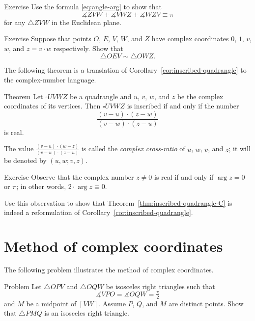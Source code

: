 \begin{thm}{Exercise}\label{ex:3-sum-C}
Use the formula \ref{eq:angle-arg} to show that  
$$\measuredangle ZVW+\measuredangle VWZ+\measuredangle WZV\equiv \pi$$
for any $\triangle ZVW$ in the Euclidean plane.
\end{thm}

\begin{thm}{Exercise}\label{ex:C-sim}
Suppose that points $O$, $E$, $V$, $W$, and $Z$ have complex coordinates $0$, $1$, $v$, $w$, and $z=v\cdot w$ respectively.
Show that 
\[\triangle OEV\sim \triangle OWZ.\]

\end{thm}

The following theorem is a translation of Corollary~\ref{cor:inscribed-quadrangle} to the complex-number language.

\begin{thm}{Theorem}\label{thm:inscribed-quadrangle-C}
Let $\square UVWZ$ be a quadrangle and $u$, $v$, $w$, and $z$ be the complex coordinates of its vertices. 
Then $\square UVWZ$ is inscribed 
if and only if the number
$$\frac{(v-u)\cdot(z-w)}{(v-w)\cdot(z-u)}$$ 
is real.
\end{thm}

The value $\frac{(v-u)\cdot(w-z)}{(v-w)\cdot(z-u)}$ is called the 
\emph{complex cross-ratio} of $u$, $w$, $v$, and $z$; 
it will be denoted by $(u,w;v,z)$.



\begin{thm}{Exercise}\label{ex:real-cross-ratio}
Observe that the complex number $z\ne 0$ is real if and only if $\arg z=0$ or $\pi$;
in other words, $2\cdot\arg z\equiv 0$.

Use this observation to show that Theorem~\ref{thm:inscribed-quadrangle-C}
is indeed a reformulation of Corollary~\ref{cor:inscribed-quadrangle}.
\end{thm}

\section{Method of complex coordinates}

The following problem illustrates the method of complex coordinates.

\begin{thm}{Problem}\label{prob:2right-tringles}
Let $\triangle OPV$ and $\triangle OQW$ be isosceles right triangles such that 
\[\measuredangle VPO=\measuredangle OQW=\tfrac\pi2\] 
and $M$ be a midpoint of $[VW]$.
Assume $P$, $Q$, and $M$ are distinct points.
Show that  $\triangle PMQ$ is an isosceles right triangle.
\end{thm}

